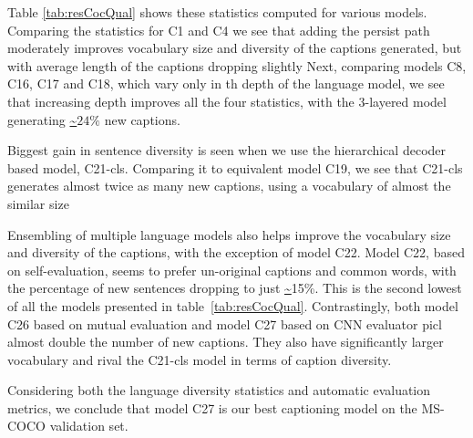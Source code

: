 Table \ref{tab:resCocQual} shows these statistics computed for various
models. 
Comparing the statistics for C1 and C4 we see that adding the persist path
moderately improves vocabulary size and diversity of the captions generated,
but with average length of the captions dropping slightly
Next, comparing models C8, C16, C17 and C18, which vary only in th depth of the
language model, we see that increasing depth improves all the four statistics,
with the 3-layered model generating \url{~}$24\%$ new captions.

Biggest gain in sentence diversity is seen when we use the hierarchical decoder
based model, C21-cls. 
Comparing it to equivalent model C19, we see that C21-cls generates almost twice
as many new captions, using a vocabulary of almost the similar size

Ensembling of multiple language models also helps improve the vocabulary size
and diversity of the captions, with the exception of model C22.
Model C22, based on self-evaluation, seems to prefer un-original captions and
common words, with the percentage of new sentences dropping to just \url{~}15\%.
This is the second lowest of all the models presented in
table~\ref{tab:resCocQual}.
Contrastingly, both model C26 based on mutual evaluation and model C27 based on CNN
evaluator picl almost double the number of new captions.
They also have significantly larger vocabulary and rival the C21-cls model in
terms of caption diversity.

Considering both the language diversity statistics and automatic evaluation
metrics, we conclude that model C27 is our best captioning model on the
MS-COCO validation set.
